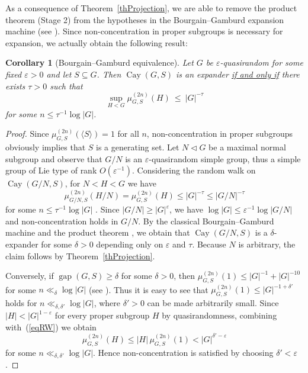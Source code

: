 \documentclass[11pt,reqno]{amsart}
\numberwithin{equation}{section}
\newtheorem{corollary}[theorem]{Corollary}
\theoremstyle{definition}
\theoremstyle{remark}
\newcommand{\Cay}{\mathop{\mathrm{Cay}}}
\newcommand{\gap}{\mathop{\mathrm{gap}}}
\begin{document}
As a consequence of Theorem~\ref{thProjection},
we are able to remove the product theorem (Stage 2)
from the hypotheses in the Bourgain--Gamburd expansion machine
(see \cite[Theorem~1.4.2]{Tao15}).
Since non-concentration in proper subgroups is necessary for expansion,
we actually obtain the following result:

\begin{corollary}[Bourgain--Gamburd equivalence] \label{corBGFinal}
Let $G$ be $\varepsilon$-quasirandom for some fixed $\varepsilon >0$ and let $S \subseteq G$.
Then $\Cay(G,S)$ is an expander \underline{if and only if} there exists $\tau>0$ such that
$$ \sup_{H<G} \mu_{G,S}^{(2n)}(H) \> \leq \> |G|^{-\tau} $$
for some $n \leq \tau^{-1} \log|G|$.
\end{corollary}
\begin{proof}
Since $\mu_{G,S}^{(2n)}(\langle S \rangle) =1$ for all $n$,
non-concentration in proper subgroups obviously implies that $S$ is a generating set.
Let $N \lhd G$ be a maximal normal subgroup
and observe that $G/N$ is an $\varepsilon$-quasirandom simple group,
thus a simple group of Lie type of rank $O(\varepsilon^{-1})$.
Considering the random walk on $\Cay(G/N,S)$, for $N<H<G$ we have
$$ \mu_{G/N,S}^{(2n)}(H/N) = \mu_{G,S}^{(2n)}(H) \leq |G|^{-\tau} \leq |G/N|^{-\tau} $$
for some $n \leq \tau^{-1} \log|G|$ .
Since $|G/N| \geq |G|^\varepsilon$,
we have $\log|G| \leq \varepsilon^{-1} \log|G/N|$
and non-concentration holds in $G/N$.
By the classical Bourgain--Gamburd machine \cite[Theorem~1.4.2]{Tao15} and the product theorem \cite{BGT11,PS16},
we obtain that $\Cay(G/N,S)$ is a $\delta$-expander for some $\delta >0$ depending only on $\varepsilon$ and $\tau$.
Because $N$ is arbitrary, the claim follows by Theorem~\ref{thProjection}.

Conversely, if $\gap(G,S) \geq \delta$ for some $\delta>0$,
then $\mu_{G,S}^{(2n)}(1) \leq |G|^{-1} + |G|^{-10}$ for some $n \ll_\delta \log|G|$
(see \cite[Exercise~1.1.16]{Tao15}).
Thus it is easy to see that $\mu_{G,S}^{(2n)}(1) \leq |G|^{-1 +\delta'}$ holds for $n \ll_{\delta,\delta'} \log|G|$,
where $\delta'>0$ can be made arbitrarily small.
Since $|H| < |G|^{1-\varepsilon}$ for every proper subgroup $H$ by quasirandomness,
combining with~(\ref{eqRW}) we obtain
$$ \mu_{G,S}^{(2n)}(H) \leq |H| \, \mu_{G,S}^{(2n)}(1) < |G|^{\delta' - \varepsilon} $$
for some $n \ll_{\delta,\delta'} \log|G|$.
Hence non-concentration is satisfied by choosing $\delta' < \varepsilon$.
\end{proof}
\end{document}
